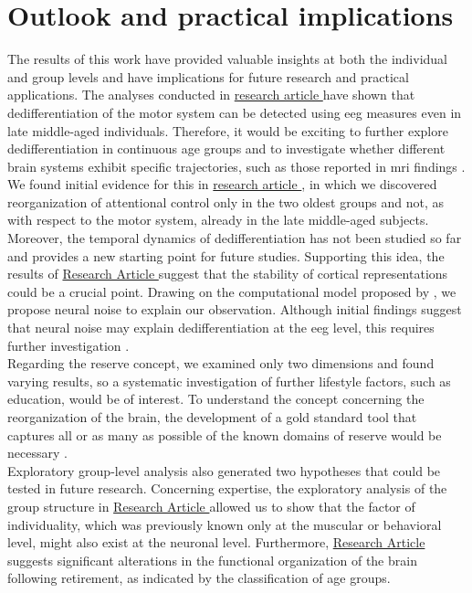 \section{Outlook and practical implications}
The results of this work have provided valuable insights at both the individual and group levels and have implications for future research and practical applications. The analyses conducted in \hyperref[results:paperI]{research article } have shown that dedifferentiation of the motor system can be detected using \gls{eeg} measures even in late middle-aged individuals. Therefore, it would be exciting to further explore dedifferentiation in continuous age groups and to investigate whether different brain systems exhibit specific trajectories, such as those reported in \gls{mri} findings \cite{Raz2006}. We found initial evidence for this in \hyperref[results:paperII]{research article }, in which we discovered reorganization of attentional control only in the two oldest groups and not, as with respect to the motor system, already in the late middle-aged subjects.\\
Moreover, the temporal dynamics of dedifferentiation has not been studied so far and provides a new starting point for future studies. Supporting this idea, the results of \hyperref[results:paperIII]{Research Article } suggest that the stability of cortical representations could be a crucial point. Drawing on the computational model proposed by \citeauthor{Li2002} \cite{Li2002,Li2000}, we propose neural noise to explain our observation. Although initial findings suggest that neural noise may explain dedifferentiation at the \gls{eeg} level, this requires further investigation \cite{Pichot2022}.\\
Regarding the reserve concept, we examined only two dimensions and found varying results, so a systematic investigation of further lifestyle factors, such as education, would be of interest. To understand the concept concerning the reorganization of the brain, the development of a gold standard tool that captures all or as many as possible of the known domains of reserve would be necessary \cite{Nogueira2022}.\\
Exploratory group-level analysis also generated two hypotheses that could be tested in future research. Concerning expertise, the exploratory analysis of the group structure in \hyperref[results:paperIII]{Research Article } allowed us to show that the factor of individuality, which was previously known only at the muscular or behavioral level, might also exist at the neuronal level. Furthermore, \hyperref[results:paperII]{Research Article } suggests significant alterations in the functional organization of the brain following retirement, as indicated by the classification of age groups.\\
